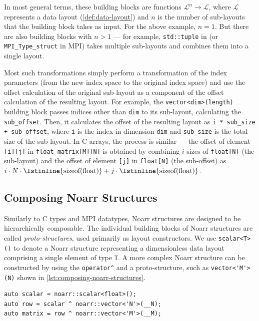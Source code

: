 In most general terms, these building blocks are functions $\mathcal{L}^n \to \mathcal{L}$, where $\mathcal{L}$ represents a data layout (\cref{def:data-layout}) and $n$ is the number of sub-layouts that the building block takes as input. For the above example, $n = 1$. But there are also building blocks with $n > 1$ --- for example, \lstinline{std::tuple} in \cpp (or \lstinline{MPI_Type_struct} in MPI) takes multiple sub-layouts and combines them into a single layout.

Most such transformations simply perform a transformation of the index parameters (from the new index space to the original index space) and use the offset calculation of the original sub-layout as a component of the offset calculation of the resulting layout. For example, the \lstinline{vector<dim>(length)} building block passes indices other than \lstinline{dim} to its sub-layout, calculating the \lstinline{sub_offset}. Then, it calculates the offset of the resulting layout as \lstinline{i * sub_size + sub_offset}, where \lstinline{i} is the index in dimension \lstinline{dim} and \lstinline{sub_size} is the total size of the sub-layout. In C arrays, the process is similar --- the offset of element \lstinline{[i][j]} in \lstinline{float matrix[M][N]} is obtained by combining $i$ sizes of \lstinline{float[N]} (the sub-layout) and the offset of element \lstinline{[j]} in \lstinline{float[N]} (the sub-offset) as $i \cdot N \cdot \text{\lstinline{sizeof(float)}} + j \cdot \text{\lstinline{sizeof(float)}}$.


\subsection{Composing Noarr Structures}\label{sec:composing-noarr-structures}

Similarly to C types and MPI datatypes, Noarr structures are designed to be hierarchically composable. The individual building blocks of Noarr structures are called \emph{proto-structures}, used primarily as layout constructors. We use \lstinline{scalar<T>()} to denote a Noarr structure representing a dimensionless data layout comprising a single element of type \texttt{T}. A more complex Noarr structure can be constructed by using the \lstinline{operator^} and a proto-structure, such as \lstinline{vector<'M'>(N)} shown in \cref{lst:composing-noarr-structures}.

\begin{lstlisting}[style=C++, caption={Composing Noarr structures using proto-structures.}, label={lst:composing-noarr-structures}]
auto scalar = noarr::scalar<float>();
auto row = scalar ^ noarr::vector<'N'>(__N);
auto matrix = row ^ noarr::vector<'M'>(__M);
\end{lstlisting}

